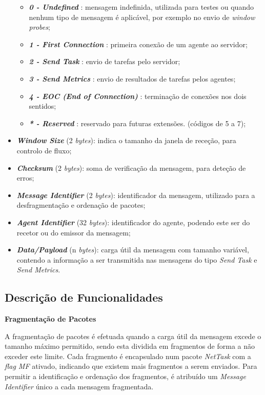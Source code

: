 \documentclass[a4paper,12pt]{scrreprt}
\begin{document}
\begin{itemize}
\begin{itemize}
            \item \textbf{\textit{0 - Undefined}}               : mensagem indefinida, utilizada
                para testes ou quando nenhum tipo de mensagem é aplicável,
                por exemplo no envio de \textit{window probes};
            \item \textbf{\textit{1 - First Connection}}        : primeira conexão de um agente ao servidor;
            \item \textbf{\textit{2 - Send Task}}               : envio de tarefas pelo servidor;
            \item \textbf{\textit{3 - Send Metrics}}            : envio de resultados de tarefas pelos agentes;
            \item \textbf{\textit{4 - EOC (End of Connection)}} : terminação de conexões nos dois sentidos;
            \item \textbf{\textit{* - Reserved}}                : reservado para futuras extensões. (códigos de 5 a 7);
        \end{itemize}
    \item \textbf{\textit{Window Size}}        (2 \textit{bytes}): indica o tamanho da janela de receção,
        para controlo de fluxo;
    \item \textbf{\textit{Checksum}}           (2 \textit{bytes}): soma de verificação da mensagem,
        para deteção de erros;
    \item \textbf{\textit{Message Identifier}} (2 \textit{bytes}): identificador da mensagem,
        utilizado para a desfragmentação e ordenação de pacotes;
    \item \textbf{\textit{Agent Identifier}}   (32 \textit{bytes}): identificador do agente,
        podendo este ser do recetor ou do emissor da mensagem;
    \item \textbf{\textit{Data/Payload}}       (n \textit{bytes}): carga útil da mensagem com
        tamanho variável, contendo a informação a ser transmitida nas mensagens do tipo
        \textit{Send Task} e \textit{Send Metrics}.
\end{itemize}

\subsection{Descrição de Funcionalidades}
\label{subsec:nt_desc_funcionalidades}

\textbf{Fragmentação de Pacotes}

A fragmentação de pacotes é efetuada quando a carga útil da mensagem excede o
tamanho máximo permitido, sendo esta dividida em fragmentos de forma a não exceder
este limite. Cada fragmento é encapsulado num pacote \textit{NetTask} com a
\textit{flag MF} ativado, indicando que existem mais fragmentos a serem enviados.
Para permitir a identificação e ordenação dos fragmentos, é atribuído um
\textit{Message Identifier} único a cada mensagem fragmentada.
\end{document}
